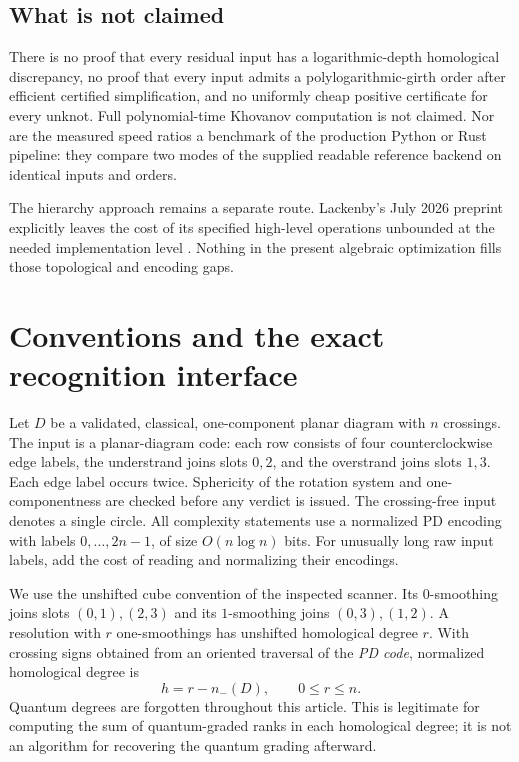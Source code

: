 \documentclass[11pt]{article}
\theoremstyle{definition}\newtheorem{definition}[theorem]{Definition}
\theoremstyle{remark}\newtheorem{remark}[theorem]{Remark}
\begin{document}
\subsection{What is not claimed}
There is no proof that every residual input has a logarithmic-depth homological discrepancy, no proof that every input admits a polylogarithmic-girth order after efficient certified simplification, and no uniformly cheap positive certificate for every unknot. Full polynomial-time Khovanov computation is not claimed. Nor are the measured speed ratios a benchmark of the production Python or Rust pipeline: they compare two modes of the supplied readable reference backend on identical inputs and orders.

The hierarchy approach remains a separate route. Lackenby's July 2026 preprint explicitly leaves the cost of its specified high-level operations unbounded at the needed implementation level \cite[Section 9]{Lackenby}. Nothing in the present algebraic optimization fills those topological and encoding gaps.

\section{Conventions and the exact recognition interface}
\label{sec:conventions}
Let $D$ be a validated, classical, one-component planar diagram with $n$ crossings. The input is a planar-diagram code: each row consists of four counterclockwise edge labels, the understrand joins slots $0,2$, and the overstrand joins slots $1,3$. Each edge label occurs twice. Sphericity of the rotation system and one-componentness are checked before any verdict is issued. The crossing-free input denotes a single circle. All complexity statements use a normalized PD encoding with labels $0,\ldots,2n-1$, of size $O(n\log n)$ bits. For unusually long raw input labels, add the cost of reading and normalizing their encodings.

We use the unshifted cube convention of the inspected scanner. Its $0$-smoothing joins slots $(0,1),(2,3)$ and its $1$-smoothing joins $(0,3),(1,2)$. A resolution with $r$ one-smoothings has unshifted homological degree $r$. With crossing signs obtained from an oriented traversal of the \emph{PD code}, normalized homological degree is
\begin{equation}
 h=r-n_-(D),\qquad 0\leq r\leq n.\label{eq:shift}
\end{equation}
Quantum degrees are forgotten throughout this article. This is legitimate for computing the sum of quantum-graded ranks in each homological degree; it is not an algorithm for recovering the quantum grading afterward.
\end{document}
